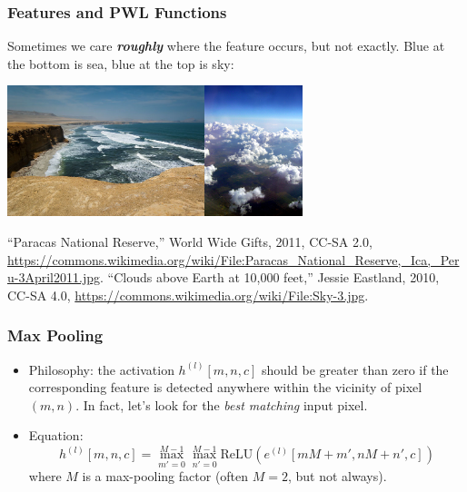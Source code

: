 \documentclass{beamer}
\begin{document}
\begin{frame}
  \frametitle{Features and PWL Functions}

  Sometimes we care {\bf\em roughly} where the feature occurs, but not
  exactly.  Blue at the bottom is sea, blue at the top is sky:
  \centerline{\includegraphics[height=1.5in]{figs/sea.jpg}\hspace*{1cm}\includegraphics[height=1.5in]{figs/sky.jpg}}
  \begin{tiny}
    ``Paracas National Reserve,'' World Wide Gifts, 2011, CC-SA 2.0,
    \url{https://commons.wikimedia.org/wiki/File:Paracas_National_Reserve,_Ica,_Peru-3April2011.jpg}.
    ``Clouds above Earth at 10,000 feet,'' Jessie Eastland, 2010, CC-SA 4.0,
    \url{https://commons.wikimedia.org/wiki/File:Sky-3.jpg}.
  \end{tiny}
\end{frame}

\begin{frame}
  \frametitle{Max Pooling}
  \begin{itemize}
  \item Philosophy: the activation $h^{(l)}[m,n,c]$ should be greater
    than zero if the corresponding feature is detected anywhere within
    the vicinity of pixel $(m,n)$.  In fact, let's look for the {\em
      best matching} input pixel.
  \item Equation:
    \begin{displaymath}
      h^{(l)}[m,n,c] = \max_{m'=0}^{M-1}\max_{n'=0}^{M-1} \mbox{ReLU}\left(e^{(l)}[mM+m',nM+n',c]\right)
    \end{displaymath}
    where $M$ is a max-pooling factor (often $M=2$, but not always).
  \end{itemize}
\end{frame}
\end{document}
